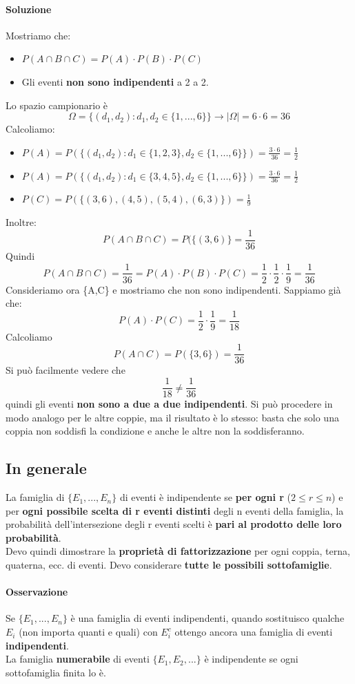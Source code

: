 \documentclass{report}
\begin{document}
\begin{enumerate}
    \paragraph{Soluzione} Mostriamo che: \begin{itemize}
        \item \(P(A\cap B \cap C) = P(A)\cdot P(B)\cdot P(C)\)
        \item Gli eventi \textbf{non sono indipendenti} a 2 a 2.
    \end{itemize}
    Lo spazio campionario è \[\Omega = \{(d_1, d_2): d_1,d_2 \in \{1,...,6\}\} \xrightarrow{} |\Omega| = 6\cdot 6 = 36\]
    Calcoliamo: \begin{itemize}
        \item \(P(A) = P(\{(d_1,d_2): d_1 \in \{1,2,3\}, d_2 \in \{1,...,6\}\}) = \frac{3\cdot 6}{36} = \frac{1}{2}\)
        \item \(P(A) = P(\{(d_1,d_2): d_1 \in \{3,4,5\}, d_2 \in \{1,...,6\}\}) = \frac{3\cdot 6}{36} = \frac{1}{2}\)
        \item \(P(C) = P(\{(3,6), (4,5), (5,4), (6,3)\}) = \frac{1}{9}\)
    \end{itemize}
    Inoltre: \[P(A\cap B\cap C) = P(\{(3,6)\} = \frac{1}{36}\]
    Quindi \[P(A\cap B\cap C) = \frac{1}{36} = P(A)\cdot P(B)\cdot P(C) = \frac{1}{2}\cdot \frac{1}{2}\cdot \frac{1}{9} = \frac{1}{36}\] 
    Consideriamo ora \{A,C\} e mostriamo che non sono indipendenti. Sappiamo già che: \[P(A)\cdot P(C) = \frac{1}{2}\cdot \frac{1}{9} = \frac{1}{18}\]
    Calcoliamo \[P(A\cap C) = P(\{3,6\}) = \frac{1}{36}\]
    Si può facilmente vedere che \[\frac{1}{18} \neq \frac{1}{36}\]
    quindi gli eventi \textbf{non sono a due a due indipendenti}. Si può procedere in modo analogo per le altre coppie, ma il risultato è lo stesso: basta che solo una coppia non soddisfi la condizione e anche le altre non la soddisferanno.
\end{enumerate}
\subsection{In generale}
La famiglia di \(\{E_1,...,E_n\}\) di eventi è indipendente se \textbf{per ogni r} (\(2 \leq r \leq n\)) e per \textbf{ogni possibile scelta di r eventi distinti} degli n eventi della famiglia, la probabilità dell'intersezione degli r eventi scelti è \textbf{pari al prodotto delle loro probabilità}.\\
Devo quindi dimostrare la \textbf{proprietà di fattorizzazione} per ogni coppia, terna, quaterna, ecc. di eventi. Devo considerare \textbf{tutte le possibili sottofamiglie}.
\paragraph{Osservazione} Se \(\{E_1,...,E_n\}\) è una famiglia di eventi indipendenti, quando sostituisco qualche \(E_i\) (non importa quanti e quali) con \(E_i^c\) ottengo ancora una famiglia di eventi \textbf{indipendenti}.\\
La famiglia \textbf{numerabile} di eventi \(\{E_1,E_2,...\}\) è indipendente se ogni sottofamiglia finita lo è.
\end{document}
